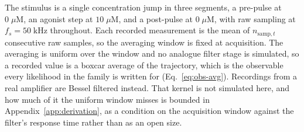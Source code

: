 The stimulus is a single concentration jump in three segments, a pre-pulse at
$0\;\mu\mathrm{M}$, an agonist step at $10\;\mu\mathrm{M}$, and a post-pulse at
$0\;\mu\mathrm{M}$, with raw sampling at $f_s = 50\;\mathrm{kHz}$ throughout.
Each recorded measurement is the mean of $n_{\mathrm{samp},t}$ consecutive raw
samples, so the averaging window is fixed at acquisition.
The averaging is uniform over the window and no analogue filter stage is simulated,
so a recorded value is a boxcar average of the trajectory, which is the observable
every likelihood in the family is written for (Eq.~\ref{eq:obs-avg}). Recordings from a real
amplifier are Bessel filtered instead. %
That kernel is not simulated here, and how much of it the
uniform window misses is bounded in Appendix~\ref{app:derivation}, as a condition on the
acquisition window against the filter's response time rather than as an open size.
